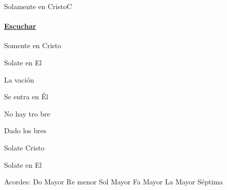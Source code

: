 \documentclass[12pt, spanish]{book}
\newcommand{\NotCCLIed}{\relax}
\begin{document}
    \begin{song}{Solamente en Cristo}{C}
        {} %
        {}
        {} %
        {} %
        \ifChordBk
        \paragraph{\mbox{}\hfill\protect\href{https://open.spotify.com/intl-es/track/1B7WNF8Sw1NiiUBmQABZdl}{Escuchar}\mbox{}\hfill}
        \fi



        \begin{SBOpGroup}
            Somente en Cristo

            Solate en El

            La vación

            Se entra en Él

            No hay tro bre

            Dado  los bres

            Solate  Cristo

            Solate en El
        \end{SBOpGroup}

        \ifChordBk
        \begin{SBOpGroup}
            Acordes:
            \upchord{\C}\qquad Do Mayor \hfill
            \upchord{\Dm}\qquad Re menor  \hfill\null\break
            \upchord{\G}\qquad Sol Mayor \hfill
            \upchord{\F}\qquad Fa Mayor \hfill\null\break
            \upchord{\Aseven}\qquad La Mayor S\'eptima \hfill\null\break
        \end{SBOpGroup}
        \fi
    \end{song}
\end{document}

